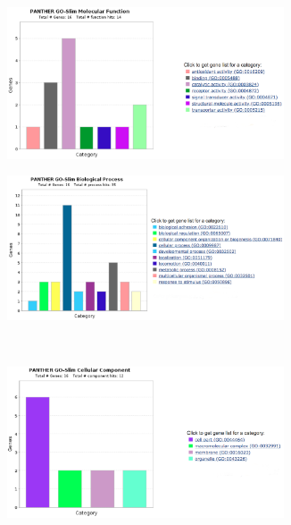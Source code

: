 \begin{figure}[H]
\label{adNOTadpdfigure}
\begin{subfigure}[b]{0.5\linewidth}
\centering
\includegraphics[width=0.9\textwidth]{./Figures/GO/adNOTadpd/adNOTadpd1}\par
\end{subfigure}
\begin{subfigure}[b]{0.5\linewidth}
\centering
\includegraphics[width=0.9\textwidth]{./Figures/GO/adNOTadpd/adNOTadpd2}\par
\end{subfigure}\\
\begin{subfigure}[b]{0.5\linewidth}
\centering
\includegraphics[width=0.9\textwidth]{./Figures/GO/adNOTadpd/adNOTadpd3}\par

\end{subfigure}
\end{figure}

